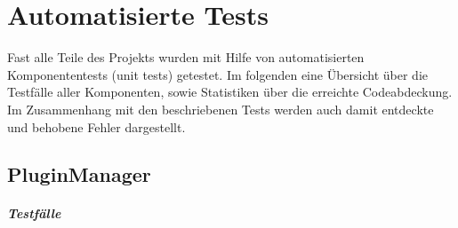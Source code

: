 \chapter{Automatisierte Tests}
Fast alle Teile des Projekts wurden mit Hilfe von automatisierten Komponententests (unit tests) getestet. Im folgenden eine Übersicht über die Testfälle aller Komponenten, sowie Statistiken über die erreichte Codeabdeckung.
Im Zusammenhang mit den beschriebenen Tests werden auch damit entdeckte und behobene Fehler dargestellt.

\section{PluginManager}

\paragraph*{Testfälle}
